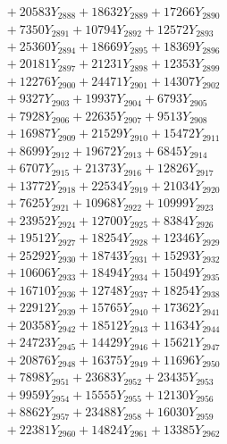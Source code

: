 \documentclass[a4paper,10pt]{article}
\begin{document}
{\begin{align}
&\;  + 20583 Y_{2888} + 18632 Y_{2889} + 17266 Y_{2890} \\[0.3ex]
&\;  + 7350 Y_{2891} + 10794 Y_{2892} + 12572 Y_{2893} \\[0.3ex]
&\;  + 25360 Y_{2894} + 18669 Y_{2895} + 18369 Y_{2896} \\[0.3ex]
&\;  + 20181 Y_{2897} + 21231 Y_{2898} + 12353 Y_{2899} \\[0.3ex]
&\;  + 12276 Y_{2900} + 24471 Y_{2901} + 14307 Y_{2902} \\[0.3ex]
&\;  + 9327 Y_{2903} + 19937 Y_{2904} + 6793 Y_{2905} \\[0.3ex]
&\;  + 7928 Y_{2906} + 22635 Y_{2907} + 9513 Y_{2908} \\[0.5ex]\allowbreak
&\;  + 16987 Y_{2909} + 21529 Y_{2910} + 15472 Y_{2911} \\[0.3ex]
&\;  + 8699 Y_{2912} + 19672 Y_{2913} + 6845 Y_{2914} \\[0.3ex]
&\;  + 6707 Y_{2915} + 21373 Y_{2916} + 12826 Y_{2917} \\[0.3ex]
&\;  + 13772 Y_{2918} + 22534 Y_{2919} + 21034 Y_{2920} \\[0.3ex]
&\;  + 7625 Y_{2921} + 10968 Y_{2922} + 10999 Y_{2923} \\[0.3ex]
&\;  + 23952 Y_{2924} + 12700 Y_{2925} + 8384 Y_{2926} \\[0.3ex]
&\;  + 19512 Y_{2927} + 18254 Y_{2928} + 12346 Y_{2929} \\[0.3ex]
&\;  + 25292 Y_{2930} + 18743 Y_{2931} + 15293 Y_{2932} \\[0.3ex]
&\;  + 10606 Y_{2933} + 18494 Y_{2934} + 15049 Y_{2935} \\[0.3ex]
&\;  + 16710 Y_{2936} + 12748 Y_{2937} + 18254 Y_{2938} \\[0.5ex]\allowbreak
&\;  + 22912 Y_{2939} + 15765 Y_{2940} + 17362 Y_{2941} \\[0.3ex]
&\;  + 20358 Y_{2942} + 18512 Y_{2943} + 11634 Y_{2944} \\[0.3ex]
&\;  + 24723 Y_{2945} + 14429 Y_{2946} + 15621 Y_{2947} \\[0.3ex]
&\;  + 20876 Y_{2948} + 16375 Y_{2949} + 11696 Y_{2950} \\[0.3ex]
&\;  + 7898 Y_{2951} + 23683 Y_{2952} + 23435 Y_{2953} \\[0.3ex]
&\;  + 9959 Y_{2954} + 15555 Y_{2955} + 12130 Y_{2956} \\[0.3ex]
&\;  + 8862 Y_{2957} + 23488 Y_{2958} + 16030 Y_{2959} \\[0.3ex]
&\;  + 22381 Y_{2960} + 14824 Y_{2961} + 13385 Y_{2962} \\[0.3ex]

\end{align}}
\end{document}
